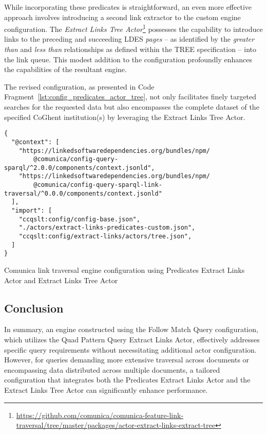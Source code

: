 While incorporating these predicates is straightforward, an even more effective approach involves introducing a second link extractor to the custom engine configuration. The \textit{Extract Links Tree Actor}\footnote{\href{https://github.com/comunica/comunica-feature-link-traversal/tree/master/packages/actor-extract-links-extract-tree}{https://github.com/comunica/comunica-feature-link-traversal/tree/master/packages/actor-extract-links-extract-tree}} possesses the capability to introduce links to the preceding and succeeding LDES \textit{pages} – as identified by the \textit{greater than} and \textit{less than} relationships as defined within the TREE specification – into the link queue. This modest addition to the configuration profoundly enhances the capabilities of the resultant engine.

The revised configuration, as presented in Code Fragment~\ref{lst:config_predicates_actor_tree}, not only facilitates finely targeted searches for the requested data but also encompasses the complete dataset of the specified CoGhent institution(s) by leveraging the Extract Links Tree Actor.

\begin{listing}[htbp]
    \begin{verbatim}
{
  "@context": [
    "https://linkedsoftwaredependencies.org/bundles/npm/
        @comunica/config-query-sparql/^2.0.0/components/context.jsonld",
    "https://linkedsoftwaredependencies.org/bundles/npm/
        @comunica/config-query-sparql-link-traversal/^0.0.0/components/context.jsonld"
  ],
  "import": [
    "ccqslt:config/config-base.json",
    "./actors/extract-links-predicates-custom.json",
    "ccqslt:config/extract-links/actors/tree.json",
  ]
}
    \end{verbatim}
    \caption{Comunica link traversal engine configuration using Predicates Extract Links Actor and Extract Links Tree Actor}
    \label{lst:config_predicates_actor_tree}
\end{listing}

\subsection{Conclusion}

In summary, an engine constructed using the Follow Match Query configuration, which utilizes the Quad Pattern Query Extract Links Actor, effectively addresses specific query requirements without necessitating additional actor configuration. However, for queries demanding more extensive traversal across documents or encompassing data distributed across multiple documents, a tailored configuration that integrates both the Predicates Extract Links Actor and the Extract Links Tree Actor can significantly enhance performance. 

